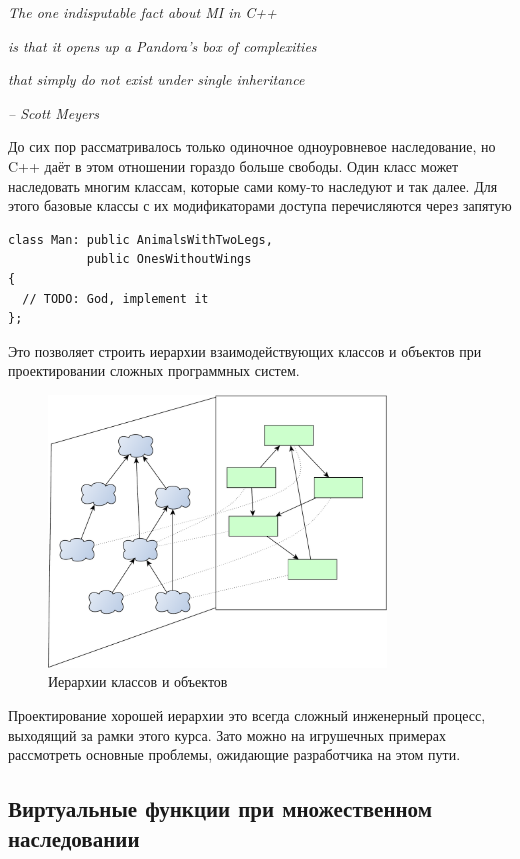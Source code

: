 \documentclass[a4paper,12pt,oneside]{book}
\begin{document}
\hfill\textit{The one indisputable fact about MI in C++}

\hfill\textit{is that it opens up a Pandora's box of complexities}

\hfill\textit{that simply do not exist under single inheritance}{\vspace{0.5em}}

\hfill\textit{-- Scott Meyers}

До сих пор рассматривалось только одиночное одноуровневое наследование, но C++ даёт в этом отношении гораздо больше свободы. Один класс может наследовать многим классам, которые сами кому-то наследуют и так далее. Для этого базовые классы с их модификаторами доступа перечисляются через запятую

\begin{lstlisting}
class Man: public AnimalsWithTwoLegs, 
           public OnesWithoutWings 
{
  // TODO: God, implement it
};
\end{lstlisting}

Это позволяет строить иерархии взаимодействующих классов и объектов при проектировании сложных программных систем.

\begin{figure}[h!]
\centering
\includegraphics[width=0.8\textwidth]{illustrations/hierarchies-crop.pdf}
\caption{Иерархии классов и объектов}
\label{fig:hierarchies-crop}
\end{figure}

Проектирование хорошей иерархии это всегда сложный инженерный процесс, выходящий за рамки этого курса. Зато можно на игрушечных примерах рассмотреть основные проблемы, ожидающие разработчика на этом пути.

\subsection{Виртуальные функции при множественном наследовании}\label{VirtThunks}
\end{document}
